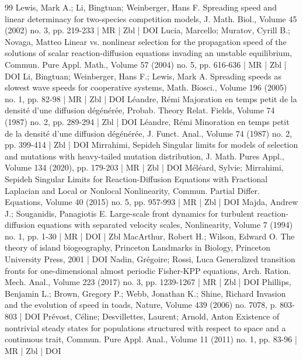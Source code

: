 \documentclass[10pt]{amsart}
\theoremstyle{definition}\newtheorem{defi}[theo]{Definition}\newtheorem{rema}[theo]{Remark}\newtheorem{exam}[theo]{Example}\newtheorem{exem}[theo]{Example}\newtheorem{nota}[theo]{Notation}
\newcommand{\1}{\mathds{1}}
\begin{document}
\begin{thebibliography}{99}
Lewis, Mark A.; Li, Bingtuan; Weinberger, Hans F. Spreading speed and linear determinacy for two-species competition models, J. Math. Biol., Volume 45 (2002) no. 3, pp. 219-233 | MR | Zbl | DOI
Lucia, Marcello; Muratov, Cyrill B.; Novaga, Matteo Linear vs. nonlinear selection for the propagation speed of the solutions of scalar reaction-diffusion equations invading an unstable equilibrium, Commun. Pure Appl. Math., Volume 57 (2004) no. 5, pp. 616-636 | MR | Zbl | DOI
Li, Bingtuan; Weinberger, Hans F.; Lewis, Mark A. Spreading speeds as slowest wave speeds for cooperative systems, Math. Biosci., Volume 196 (2005) no. 1, pp. 82-98 | MR | Zbl | DOI
Léandre, Rémi Majoration en temps petit de la densité d’une diffusion dégénérée, Probab. Theory Relat. Fields, Volume 74 (1987) no. 2, pp. 289-294 | Zbl | DOI
Léandre, Rémi Minoration en temps petit de la densité d’une diffusion dégénérée, J. Funct. Anal., Volume 74 (1987) no. 2, pp. 399-414 | Zbl | DOI
Mirrahimi, Sepideh Singular limits for models of selection and mutations with heavy-tailed mutation distribution, J. Math. Pures Appl., Volume 134 (2020), pp. 179-203 | MR | Zbl | DOI
Méléard, Sylvie; Mirrahimi, Sepideh Singular Limits for Reaction-Diffusion Equations with Fractional Laplacian and Local or Nonlocal Nonlinearity, Commun. Partial Differ. Equations, Volume 40 (2015) no. 5, pp. 957-993 | MR | Zbl | DOI
Majda, Andrew J.; Souganidis, Panagiotis E. Large-scale front dynamics for turbulent reaction-diffusion equations with separated velocity scales, Nonlinearity, Volume 7 (1994) no. 1, pp. 1-30 | MR | DOI | Zbl
MacArthur, Robert H.; Wilson, Edward O. The theory of island biogeography, Princeton Landmarks in Biology, Princeton University Press, 2001 | DOI
Nadin, Grégoire; Rossi, Luca Generalized transition fronts for one-dimensional almost periodic Fisher-KPP equations, Arch. Ration. Mech. Anal., Volume 223 (2017) no. 3, pp. 1239-1267 | MR | Zbl | DOI
Phillips, Benjamin L.; Brown, Gregory P.; Webb, Jonathan K.; Shine, Richard Invasion and the evolution of speed in toads, Nature, Volume 439 (2006) no. 7078, p. 803-803 | DOI
Prévost, Céline; Desvillettes, Laurent; Arnold, Anton Existence of nontrivial steady states for populations structured with respect to space and a continuous trait, Commun. Pure Appl. Anal., Volume 11 (2011) no. 1, pp. 83-96 | MR | Zbl | DOI

\end{thebibliography}
\end{document}
